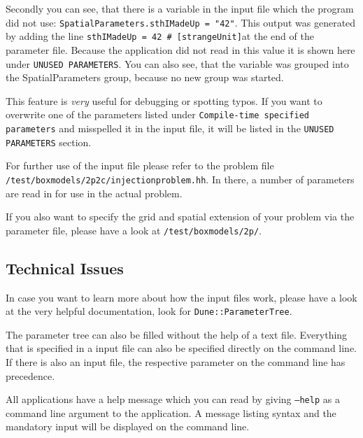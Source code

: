 Secondly you can see, that there is a variable in the input  file which the program did not use:
  \newline
  \texttt{SpatialParameters.sthIMadeUp = "42"}.
  \newline 
  This output was generated by adding the line \newline  \verb+sthIMadeUp = 42 # [strangeUnit]+\newline  at the end of the parameter file. Because the application did not read in this value it is shown here under \texttt{UNUSED PARAMETERS}. You can also see, that the variable was grouped into the SpatialParameters group, because no new group was started. 
  
  This feature is \emph{very} useful for debugging or spotting typos. If you want to overwrite one of the parameters listed under \texttt{Compile-time specified parameters} and misspelled it in the input file, it will be listed in the  \texttt{UNUSED PARAMETERS} section. 
  
  For further use of the input file please refer to the problem file 
  \newline 
  \texttt{/test/boxmodels/2p2c/injectionproblem.hh}.
  \newline
  In there, a number of parameters are read in for use in the actual problem. 

  If you also want to specify  the grid and spatial extension of your problem via the parameter file, please have a look at 
    \newline 
  \texttt{/test/boxmodels/2p/}.
  \newline
  
  \subsection{Technical Issues}
  In case you want to learn more about how the input files work, please have a look at the very helpful \Dune documentation, look for \texttt{Dune::ParameterTree}.
  
The parameter tree can also be filled without the help of a text file. Everything that is specified in a \Dumux input file can also be specified directly on the command line. If there is also an input file, the respective parameter on the command line has precedence. 

All applications have a help message which you can read by giving \texttt{--help}   as a command line argument to the application. A message listing syntax and the mandatory input will be displayed on the command line. 
  
  
